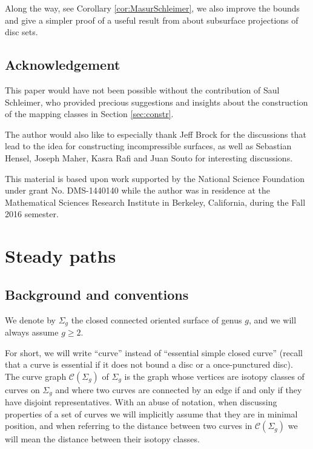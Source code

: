 \documentclass[11pt, oneside]{amsart}
\theoremstyle{definition}
\theoremstyle{definition}
\begin{document}
 Along the way, see Corollary \ref{cor:MasurSchleimer}, we also improve the bounds and give a simpler proof of a useful result from \cite{MasurSchleimer} about subsurface projections of disc sets.
 
 

 \subsection*{Acknowledgement} This paper would have not been possible without the contribution of Saul Schleimer, who provided precious suggestions and insights about the construction of the mapping classes in Section \ref{sec:constr}.
 
 The author would also like to especially thank Jeff Brock for the discussions that lead to the idea for constructing incompressible surfaces, as well as Sebastian Hensel, Joseph Maher, Kasra Rafi and Juan Souto for interesting discussions.
 
 This material is based upon work supported by the National Science Foundation under grant No. DMS-1440140 while the author was in residence at the Mathematical Sciences Research Institute in Berkeley, California, during the Fall 2016 semester.

\section{Steady paths}

\subsection{Background and conventions}
We denote by $\Sigma_g$ the closed connected oriented surface of genus $g$, and we will always assume $g\geq 2$.

For short, we will write ``curve'' instead of ``essential simple closed curve'' (recall that a curve is essential if it does not bound a disc or a once-punctured disc). The curve graph $\mathcal C(\Sigma_g)$ of $\Sigma_g$ is the graph whose vertices are isotopy classes of curves on $\Sigma_g$ and where two curves are connected by an edge if and only if they have disjoint representatives. With an abuse of notation, when discussing properties of a set of curves we will implicitly assume that they are in minimal position, and when referring to the distance between two curves in $\mathcal C(\Sigma_g)$ we will mean the distance between their isotopy classes. 
\end{document}
